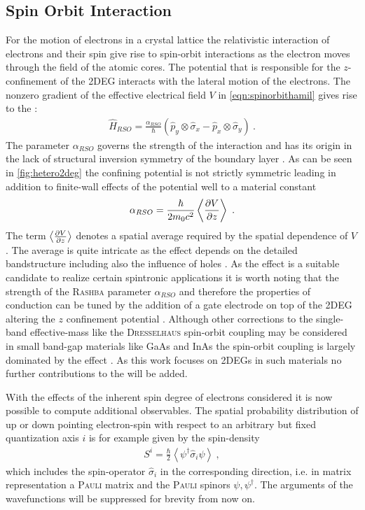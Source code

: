 \subsection{Spin Orbit Interaction}
For the motion of electrons in a crystal lattice the relativistic interaction of electrons and their spin give rise to spin-orbit interactions as the electron moves through the field of the atomic cores.
The potential that is responsible for the $z$-confinement of the 2DEG interacts with the lateral motion of the electrons. The nonzero gradient of the effective electrical field $V$ in \cref{eqn:spinorbithamil} gives rise to the \rash{} \hamil{}:
\begin{align}
  \hat{H}_{RSO} =\frac{\alpha_{RSO}}{\hbar}(\hat{p}_{y} \otimes \hat{\sigma}_{x} - \hat{p}_{x} \otimes \hat{\sigma}_{y})\ .
	\label{eqn:rashbahamiltonian}
\end{align}
The parameter $\alpha_{RSO}$ governs the strength of the interaction and has its origin in the lack of structural inversion symmetry of the boundary layer \cite{PhysRevB.70.233311}.
As can be seen in \cref{fig:hetero2deg} the confining potential is not strictly symmetric leading in addition to finite-wall effects of the potential well to a material constant \cite{Metalidis2007Thesis}
\begin{align}
\alpha_{RSO} = \frac{\hbar}{2m_0c^2} \left<\frac{\partial V}{\partial z} \right>\ .
\end{align}
The term $\left<\frac{\partial V}{\partial z} \right>$ denotes a spatial average required by the spatial dependence of $V$. The average is quite intricate as the effect depends on the detailed bandstructure including also the influence of holes \cite{JApplPhys.83.4324}.
As the \rash{} effect is a suitable candidate to realize certain spintronic applications it is worth noting that the strength of the \textsc{Rashba} parameter $\alpha_{RSO}$ and therefore the properties of conduction can be tuned by the addition of a gate electrode on top of the 2DEG altering the $z$ confinement potential \cite{PhysRevLett.78.1335}.
Although other corrections to the single-band effective-mass \hamil{} like the \textsc{Dresselhaus} spin-orbit coupling \cite{PhysRev.100.580} may be considered in small band-gap materials like GaAs and InAs the spin-orbit coupling is largely dominated by the \rash{} effect \cite{PhysRevB.61.15588}. As this work focuses on 2DEGs in such materials no further contributions to the \hamil{} will be added.\par
With the effects of the inherent spin degree of electrons considered it is now possible to compute additional observables. The spatial probability distribution of up or down pointing electron-spin with respect to an arbitrary but fixed quantization axis $i$ is for example given by the spin-density \cite{JPhysA:MathGen.18.671}
\begin{align}
S^i  = \frac{\hbar}{2} \left< \psi^{\dagger} \hat{\sigma}_i \psi \right>\ ,
\label{eqn:spindensity}
\end{align}
which includes the spin-operator $\hat{\sigma}_i$ in the corresponding direction, i.e. in matrix representation a \textsc{Pauli} matrix and the \textsc{Pauli} spinors $\psi,\psi^{\dagger}$. The arguments of the wavefunctions will be suppressed for brevity from now on.
